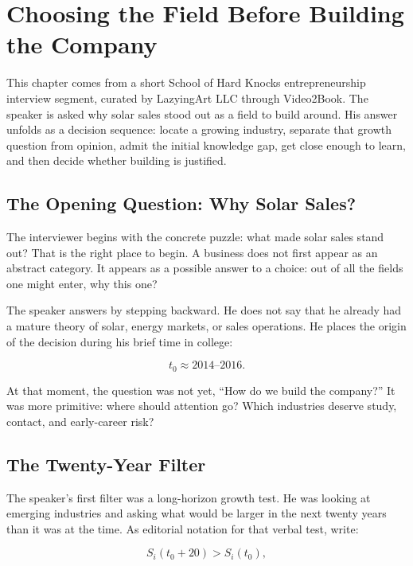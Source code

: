 \chapter{Choosing the Field Before Building the Company}

This chapter comes from a short School of Hard Knocks entrepreneurship interview segment, curated by LazyingArt LLC through Video2Book. The speaker is asked why solar sales stood out as a field to build around. His answer unfolds as a decision sequence: locate a growing industry, separate that growth question from opinion, admit the initial knowledge gap, get close enough to learn, and then decide whether building is justified.

\section{The Opening Question: Why Solar Sales?}

The interviewer begins with the concrete puzzle: what made solar sales stand out? That is the right place to begin. A business does not first appear as an abstract category. It appears as a possible answer to a choice: out of all the fields one might enter, why this one?

The speaker answers by stepping backward. He does not say that he already had a mature theory of solar, energy markets, or sales operations. He places the origin of the decision during his brief time in college:

\begin{equation}
t_0 \approx 2014\text{--}2016.
\end{equation}

At that moment, the question was not yet, ``How do we build the company?'' It was more primitive: where should attention go? Which industries deserve study, contact, and early-career risk?

\section{The Twenty-Year Filter}

The speaker's first filter was a long-horizon growth test. He was looking at emerging industries and asking what would be larger in the next twenty years than it was at the time. As editorial notation for that verbal test, write:

\begin{equation}
S_i(t_0+20) > S_i(t_0),
\end{equation}


